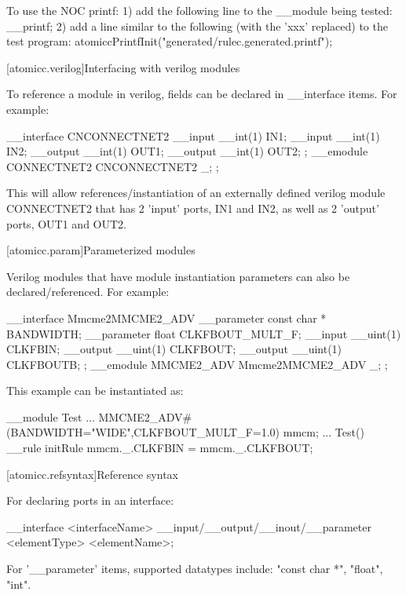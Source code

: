 To use the NOC printf:
   1) add the following line to the __module being tested:
           __printf;
   2) add a line similar to the following (with the 'xxx' replaced) to the test program:
           atomiccPrintfInit("generated/rulec.generated.printf");

[atomicc.verilog]{Interfacing with verilog modules}

To reference a module in verilog, fields can be declared in __interface items.
For example:

\begin{codeblock}
     __interface CNCONNECTNET2 {
         __input  __int(1)         IN1;
         __input  __int(1)         IN2;
         __output __int(1)         OUT1;
         __output __int(1)         OUT2;
     };
     __emodule CONNECTNET2 {
         CNCONNECTNET2 _;
     };
\end{codeblock}

This will allow references/instantiation of an externally defined verilog module CONNECTNET2
that has 2 'input' ports, IN1 and IN2, as well as 2 'output' ports, OUT1 and OUT2.

[atomicc.param]{Parameterized modules}

Verilog modules that have module instantiation parameters can also be declared/referenced.
For example:

\begin{codeblock}
     __interface Mmcme2MMCME2_ADV {
         __parameter const char *  BANDWIDTH;
         __parameter float         CLKFBOUT_MULT_F;
         __input  __uint(1)        CLKFBIN;
         __output __uint(1)        CLKFBOUT;
         __output __uint(1)        CLKFBOUTB;
     };
     __emodule MMCME2_ADV {
         Mmcme2MMCME2_ADV _;
     };
\end{codeblock}

This example can be instantiated as:

\begin{codeblock}
     __module Test {
         ...
         MMCME2_ADV#(BANDWIDTH="WIDE",CLKFBOUT_MULT_F=1.0) mmcm;
         ...
         Test() {
            __rule initRule {
                mmcm._.CLKFBIN = mmcm._.CLKFBOUT;
            }
         }
     }
\end{codeblock}

[atomicc.refsyntax]{Reference syntax}

For declaring ports in an interface:
\begin{codeblock}
     __interface <interfaceName> {
          __input/__output/__inout/__parameter <elementType> <elementName>;
     }
\end{codeblock}
For '__parameter' items, supported datatypes include: "const char *", "float", "int".

